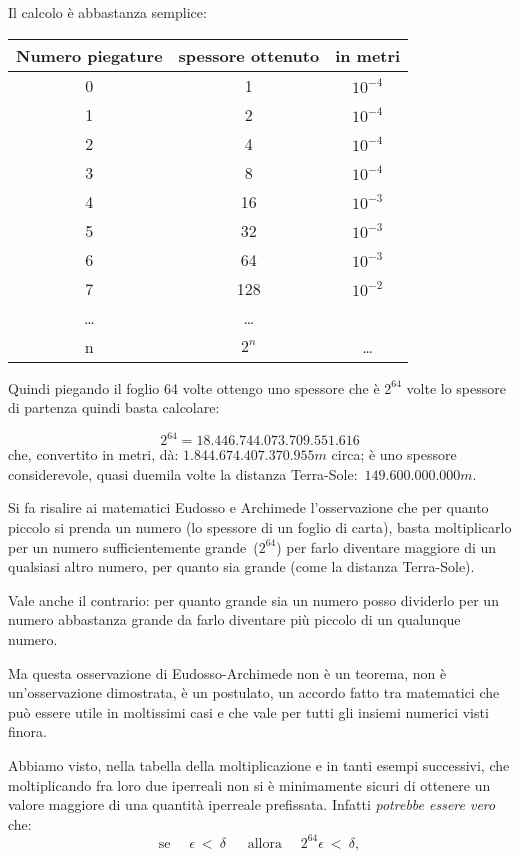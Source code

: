 Il calcolo è abbastanza semplice:

\begin{center}
 \begin{tabular}{ccc}
\toprule
Numero piegature & spessore ottenuto & in metri\\
\midrule
0 & 1 & $10^{-4}$\\
1 & 2 & $10^{-4}$\\
2 & 4 & $10^{-4}$\\
3 & 8 & $10^{-4}$\\
4 & 16 & $10^{-3}$\\
5 & 32 & $10^{-3}$\\
6 & 64 & $10^{-3}$\\
7 & 128 & $10^{-2}$\\
\ldots& \ldots\\
n & $2^n$ & \ldots\\
\bottomrule
\end{tabular}
\end{center}

Quindi piegando il foglio 64 volte ottengo uno spessore che è $2^{64}$ volte 
lo 
spessore di partenza quindi basta calcolare:

\[2^{64} = 18.446.744.073.709.551.616\]
che, convertito in metri, dà: $1.844.674.407.370.955m$ circa; è uno spessore 
considerevole, quasi duemila volte la distanza Terra-Sole:~$149.600.000.000m$.

Si fa risalire ai matematici Eudosso e Archimede l'osservazione che per 
quanto piccolo si prenda un numero (lo spessore di un foglio di carta), basta 
moltiplicarlo per un numero sufficientemente grande~($2^{64}$) per farlo 
diventare maggiore di un qualsiasi altro numero, per quanto sia grande 
(come la distanza Terra-Sole).

Vale anche il contrario: per quanto grande sia un numero posso dividerlo per 
un numero abbastanza grande da farlo diventare più piccolo di un qualunque 
numero.

Ma questa osservazione di Eudosso-Archimede non è un teorema, non è 
un'osservazione dimostrata, è un postulato, un accordo fatto tra matematici 
che può essere utile in moltissimi casi e che vale per tutti gli insiemi 
numerici visti finora. 

Abbiamo visto, nella tabella della moltiplicazione e in tanti esempi 
successivi, che moltiplicando fra loro due iperreali non si è minimamente 
sicuri di ottenere un valore maggiore di una quantità iperreale prefissata. 
Infatti \emph{potrebbe essere vero} che:
\[
 \text{se }\quad \epsilon \ < \ \delta\ \quad
 \text{ allora } \quad 2^{64}\epsilon\ <\ \delta,
\]

